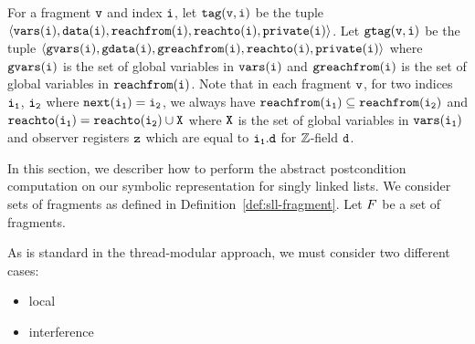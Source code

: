 For a fragment $\tt v$ and index $\tt i$, let $\tt tag(v,i)$ be the tuple $\tt \left\langle\tt vars(i), data(i),{\tt reachfrom}(\tt i), {\tt reachto}(\tt i), private(i )\right\rangle$. Let $\tt gtag(v,i)$ be the tuple $\tt \left\langle\tt gvars(i), gdata(i),{\tt greachfrom}(\tt i), {\tt reachto}(\tt i), private(i )\right\rangle$ where $\tt gvars(i)$ is the set of global variables in $\tt vars(i)$ and $\tt greachfrom(i)$ is the set of global variables in $\tt reachfrom(i)$. Note that in each fragment $\tt v$, for two indices $\tt i_1$, $\tt i_2$ where $\tt next(i_1) = i_2$, we always have $\tt {\tt reachfrom}(\tt i_1) \subseteq \tt {\tt reachfrom}(\tt i_2)$ and $\tt {\tt reachto}(\tt i_1) = \tt {\tt reachto}(\tt i_2) \cup X$ where $\tt X$ is the set of global variables in ${\tt vars}(\tt i_1)$ and observer registers $\tt z$ which are equal to $\tt i_1.d$ for ${\mathbb Z}$-field $\tt d$. 
%

In this section, we describer how to perform the abstract postcondition computation on our symbolic representation for singly linked lists. We consider
sets of fragments as defined in Definition~\ref{def:sll-fragment}.
Let $F$ be a set of fragments.

As is standard in the thread-modular approach, we must consider two different
cases:
\begin{itemize}
\item local
\item interference
\end{itemize}



